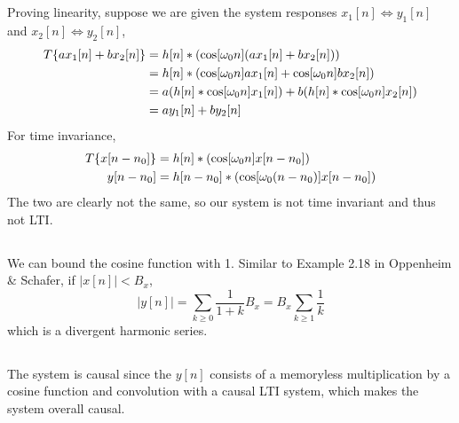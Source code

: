 \documentclass{article}
\begin{document}
\subsection{}
Proving linearity, suppose we are given the system responses \(x_1[n] \iff y_1[n]\) and \(x_2[n] \iff y_2[n]\),
\begin{align}
    T\{ax_1[n] + bx_2[n]\} &= h[n] \ast (\cosine[\omega_0 n] (ax_1[n] + bx_2[n])) \\
    &= h[n] \ast (\cos[\omega_0 n] ax_1[n] + \cos[\omega_0 n] bx_2[n]) \\
    &= a (h[n] \ast \cos[\omega_0 n] x_1[n]) + b (h[n] \ast \cos[\omega_0 n] x_2[n]) \\
    &= ay_1[n] + by_2[n]
\end{align}
For time invariance,
\begin{align}
    T\{x[n - n_0]\} &= h[n] \ast (\cosine[\omega_0 n] x[n - n_0]) \\
    y[n - n_0] &= h[n - n_0] \ast (\cosine[\omega_0 (n - n_0)] x[n - n_0])
\end{align}
The two are clearly not the same, so our system is not time invariant and thus not LTI.

\subsection{}

We can bound the cosine function with 1.
Similar to Example 2.18 in Oppenheim \& Schafer, if \(|x[n]| < B_x\),
\begin{equation}
    |y[n]| = \sum_{k \geqslant 0} \frac{1}{1 + k} B_x = B_x \sum_{k \geqslant 1} \frac{1}{k}
\end{equation}
which is a divergent harmonic series.

\subsection{}

The system is causal since the \(y[n]\) consists of a memoryless multiplication by a cosine function and convolution with a causal LTI system, which makes the system overall causal.

\newpage
\section{}

\subsection{}
\end{document}
